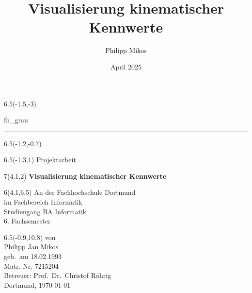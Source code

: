 \documentclass[12pt]{article}
\title{Visualisierung kinematischer Kennwerte}
\author{Philipp Mikos}
\date{April 2025}
\begin{document}
\begin{titlepage}
	\begin{textblock}{6.5}(-1.5,-3)
		\begin{color}{fh_grau}
			\rule{6.35cm}{33cm}    
		\end{color}
	\end{textblock}
	\begin{textblock}{6.5}(-1.2,-0.7)
	\end{textblock}
	\begin{textblock}{6.5}(-1.3,1)
		{\large \textsf{Projektarbeit}}            
	\end{textblock}
	
	\begin{textblock}{7}(4.1,2)
		{\noindent \huge 
			\textsf{\textbf{Visualisierung kinematischer Kennwerte\\[0.3cm] 
					} }}
	\end{textblock}
	
	
	\begin{textblock}{6}(4.1,6.5)\noindent
		\textsf{An der Fachhochschule Dortmund\\
			im Fachbereich Informatik\\
			Studiengang BA Informatik \\
			6. Fachsemester}
	\end{textblock}
	
	\begin{textblock}{6.5}(-0.9,10.8)
		\noindent
		\textsf{von \\
			Philipp Jan Mikos \\
			geb.\ am 18.02.1993  \\
			Matr.-Nr. 7215204	\\
			Betreuer: Prof.\ Dr.\ Christof Röhrig \\[0.5cm]
			Dortmund, \today}    
	\end{textblock}
	
\end{titlepage}

\justifying
{}
\tableofcontents
\newpage
\listoffigures
\newpage
\clearpage
{}







\newpage
\printbibliography
\newpage
{}

\end{document}
